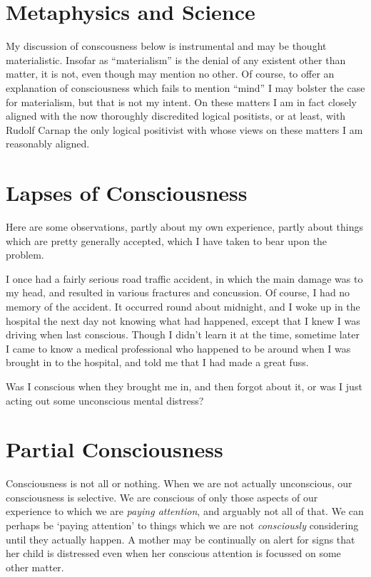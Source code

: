 \documentclass[10pt,titlepage]{book}
\begin{document}
\section{Metaphysics and Science}

My discussion of conscousness below is instrumental and may be thought materialistic.
Insofar as ``materialism'' is the denial of any existent other than matter, it is not, even though may mention no other.
Of course, to offer an explanation of consciousness which fails to mention ``mind'' I may bolster the case for materialism, but that is not my intent.
On these matters I am in fact closely aligned with the now thoroughly discredited logical positists, or at least, with Rudolf Carnap the only logical positivist with whose views on these matters I am reasonably aligned.

\section{Lapses of Consciousness}

Here are some observations, partly about my own experience, partly about things which are pretty generally accepted, which I have taken to bear upon the problem.

I once had a fairly serious road traffic accident, in which the main damage was to my head, and resulted in various fractures and concussion.
Of course, I had no memory of the accident.
It occurred round about midnight, and I woke up in the hospital the next day not knowing what had happened, except that I knew I was driving when last conscious.
Though I didn't learn it at the time, sometime later I came to know a medical professional who happened to be around when I was brought in to the hospital, and told me that I had made a great fuss.

Was I conscious when they brought me in, and then forgot about it, or was I just acting out some unconscious mental distress?

\section{Partial Consciousness}

Consciousness is not all or nothing.
When we are not actually unconscious, our consciousness is selective.
We are conscious of only those aspects of our experience to which we are \emph{paying attention}, and arguably not all of that.
We can perhaps be `paying attention' to things which we are not {\it consciously} considering until they actually happen.
A mother may be continually on alert for signs that her child is distressed even when her conscious attention is focussed on some other matter.
\end{document}
